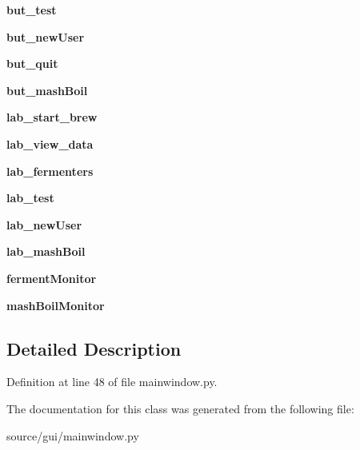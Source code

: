 \begin{DoxyCompactItemize}
{\bfseries but\+\_\+test}
\item 
\mbox{\label{classmainwindow_1_1_main_window_a382a070d9958cf70bbe5d8db0765b963}} 
{\bfseries but\+\_\+new\+User}
\item 
\mbox{\label{classmainwindow_1_1_main_window_aec57f08080cd71fa5ec090c460d75d2c}} 
{\bfseries but\+\_\+quit}
\item 
\mbox{\label{classmainwindow_1_1_main_window_a083782906c3a1dba2418043c39b262a7}} 
{\bfseries but\+\_\+mash\+Boil}
\item 
\mbox{\label{classmainwindow_1_1_main_window_aaa0a5a9e09c77740ccd9f8599be1f640}} 
{\bfseries lab\+\_\+start\+\_\+brew}
\item 
\mbox{\label{classmainwindow_1_1_main_window_ac0d30626d215b7955c5606741151ae5d}} 
{\bfseries lab\+\_\+view\+\_\+data}
\item 
\mbox{\label{classmainwindow_1_1_main_window_a0474ba6bf441281cce63a7c56b27a4c7}} 
{\bfseries lab\+\_\+fermenters}
\item 
\mbox{\label{classmainwindow_1_1_main_window_a4bb3175944a2d30124adaa6bd71275da}} 
{\bfseries lab\+\_\+test}
\item 
\mbox{\label{classmainwindow_1_1_main_window_a642737f22826ec3d274529cdddd39870}} 
{\bfseries lab\+\_\+new\+User}
\item 
\mbox{\label{classmainwindow_1_1_main_window_a84dbef3cf97f7eff099c1e0e6e1499d3}} 
{\bfseries lab\+\_\+mash\+Boil}
\item 
\mbox{\label{classmainwindow_1_1_main_window_a0537723badcb171c305a24a56aeb72d2}} 
{\bfseries ferment\+Monitor}
\item 
\mbox{\label{classmainwindow_1_1_main_window_a1c31ac5779d4b9720d014b603e111e4e}} 
{\bfseries mash\+Boil\+Monitor}
\end{DoxyCompactItemize}


\subsection{Detailed Description}


Definition at line 48 of file mainwindow.\+py.



The documentation for this class was generated from the following file\+:\begin{DoxyCompactItemize}
\item 
source/gui/mainwindow.\+py\end{DoxyCompactItemize}
